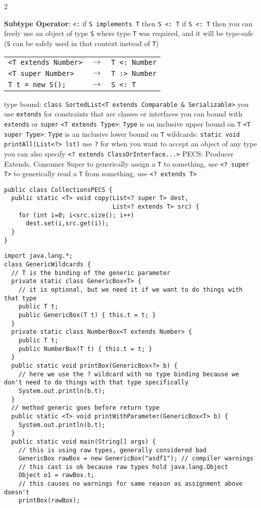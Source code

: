 \documentclass{article}
\def \columncount {2}
\newcommand{\codesize}{8.5}
\newcommand{\java}[1]{{\fontsize{\codesize}{\codesize}\selectfont\texttt{#1}}}
\begin{document}
\begin{multicols*}{\columncount}
\begin{outline}[longenum]
  \1 \textbf{Subtype Operator}: \texttt{<:}
    \2 if \java{S implements T} then \texttt{S <: T}
    \2 if \texttt{S <: T} then you can freely use an object of type \texttt{S} where type \texttt{T} was required, and it will be type-safe (\texttt{S} can be safely used in that context instead of \texttt{T})
    \2\begin{tabular}{l l l}
    \java{<T extends Number>} & $\rightarrow$ & \texttt{T <: Number} \\
    \java{<T super Number>}   & $\rightarrow$ & \texttt{T :> Number} \\
    \java{T t = new S();}     & $\rightarrow$ & \texttt{S <: T} \\
    \end{tabular}
  \1 type bound: \java{class SortedList<T extends Comparable & Serializable>}
    \2 you use \java{extends} for constraints that are classes or interfaces
    \2 you can bound with \java{extends} or \java{super}
    \2 \java{<T extends Type>}: \java{Type} is an inclusive upper bound on \java{T}
    \2 \java{<T super Type>}: \java{Type} is an inclusive lower bound on \java{T}
  \1 wildcards: \java{static void printAll(List<?> lst)} use \java{?} for when you want to accept an object of any type
    \2 you can also specify \java{<? extends ClassOrInterface...>}
  \1 PECS: Producer Extends, Consumer Super
    \2 to generically assign a \java{T} to something, use \java{<? super T>}
    \2 to generically read a \java{T} from something, use \java{<? extends T>}
\0\begin{verbatim}
public class CollectionsPECS { 
  public static <T> void copy(List<? super T> dest, 
                              List<? extends T> src) {
    for (int i=0; i<src.size(); i++) 
      dest.set(i,src.get(i)); 
  } 
}
\end{verbatim}
\0\begin{verbatim}
import java.lang.*;
class GenericWildcards {
  // T is the binding of the generic parameter
  private static class GenericBox<T> {
    // it is optional, but we need it if we want to do things with that type
    public T t;
    public GenericBox(T t) { this.t = t; }
  }
  private static class NumberBox<T extends Number> {
    public T t;
    public NumberBox(T t) { this.t = t; } 
  }
  public static void printBox(GenericBox<?> b) {
    // here we use the ? wildcard with no type binding because we don't need to do things with that type specifically
    System.out.println(b.t);
  }
  // method generic goes before return type
  public static <T> void printWithParameter(GenericBox<T> b) {
    System.out.println(b.t);
  }
  public static void main(String[] args) {
    // this is using raw types, generally considered bad
    GenericBox rawBox = new GenericBox("asdf1"); // compiler warnings
    // this cast is ok because raw types hold java.lang.Object
    Object o1 = rawBox.t;
    // this causes no warnings for same reason as assignment above doesn't
    printBox(rawBox);
    

\end{verbatim}
\end{outline}
\end{multicols*}
\end{document}
